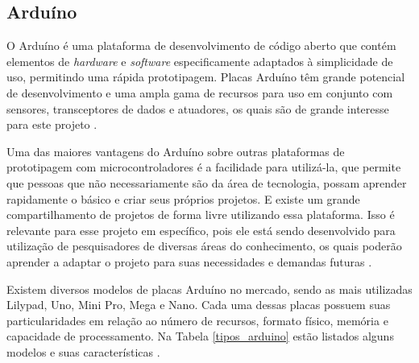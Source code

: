 	
	

\subsection{Arduíno}

O Arduíno é uma plataforma de desenvolvimento de código aberto que contém elementos de \textit{hardware} e \textit{software} especificamente adaptados à simplicidade de uso, permitindo uma rápida prototipagem. Placas Arduíno têm grande potencial de desenvolvimento e uma ampla gama de recursos para uso em conjunto com sensores, transceptores de dados e atuadores, os quais são de grande interesse para este projeto \cite{smith2016}.

Uma das maiores vantagens do Arduíno sobre outras plataformas de prototipagem com microcontroladores é a facilidade para utilizá-la, que permite que pessoas que não necessariamente são da área de tecnologia, possam aprender rapidamente o básico e criar seus próprios projetos. E existe um grande compartilhamento de projetos de forma livre utilizando essa plataforma. Isso é relevante para esse projeto em específico, pois ele está sendo desenvolvido para utilização de pesquisadores de diversas áreas do conhecimento, os quais poderão aprender a adaptar o projeto para suas necessidades e demandas futuras \cite{arduino2011}.

Existem diversos modelos de placas Arduíno no mercado, sendo as mais utilizadas Lilypad, Uno, Mini Pro, Mega e Nano. Cada uma dessas placas possuem suas particularidades em relação ao número de recursos, formato físico, memória e capacidade de processamento. Na Tabela \ref{tipos_arduino} estão listados alguns modelos e suas características \cite{smith2016}.


